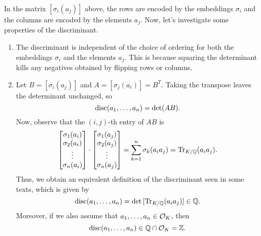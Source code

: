 In the matrix $[\sigma_i(a_j)]$ above, the rows are encoded by the 
embeddings $\sigma_i$ and the columns are encoded by the elements $a_j$. 
Now, let's investigate some properties of the discriminant. 
\begin{enumerate}[(1)]
    \item The discriminant is independent of the choice of ordering 
    for both the embeddings $\sigma_i$ and the elements $a_j$. This is 
    because squaring the determinant kills any negatives obtained 
    by flipping rows or columns.

    \item Let $B = [\sigma_i(a_j)]$ and $A = [\sigma_j(a_i)] = B^T$. 
    Taking the transpose leaves the determinant unchanged, so
    \[ \operatorname{disc}(a_1, \dots, a_n) = \det(AB). \] 
    Now, observe that the $(i, j)$-th entry of $AB$ is 
    \[ \begin{bmatrix} \sigma_1(a_i) \\ \sigma_2(a_i) \\ \vdots \\ \sigma_n(a_i) \end{bmatrix} 
    \cdot \begin{bmatrix} \sigma_1(a_j) \\ \sigma_2(a_j) \\ \vdots \\ \sigma_n(a_j) \end{bmatrix}
    = \sum_{k=1}^n \sigma_k(a_i a_j) = \operatorname{Tr}_{K/\mathbb{Q}}(a_ia_j). \]
    Thus, we obtain an equivalent definition of the discriminant seen in 
    some texts, which is given by 
    \[ \operatorname{disc}(a_1, \dots, a_n) = \det\,[\operatorname{Tr}_{K/\mathbb{Q}}(a_ia_j)] \in \mathbb{Q}. \] 
    Moreover, if we also assume that $a_1, \dots, a_n \in {\cal O}_K$, then 
    \[ \operatorname{disc}(a_1, \dots, a_n) \in \mathbb{Q} \cap {\cal O}_K = \mathbb{Z}. \] 


\end{enumerate}
